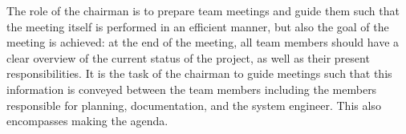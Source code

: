 The role of the chairman is to prepare team meetings and guide them such that the meeting itself is performed in an efficient manner, but also the goal of the meeting is achieved: at the end of the meeting, all team members should have a clear overview of the current status of the project, as well as their present responsibilities. It is the task of the chairman to guide meetings such that this information is conveyed between the team members including the members responsible for planning, documentation, and the system engineer. This also encompasses making the agenda.
